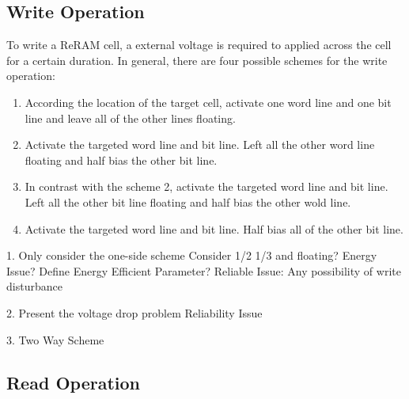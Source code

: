 \subsection{Write Operation}
To write a ReRAM cell, a external voltage is required to applied across the cell for a certain duration. In general, there are four possible schemes for the write operation:
\begin{enumerate}
  \item According the location of the target cell, activate one word line and one bit line and leave all of the other lines floating.
  \item Activate the targeted word line and bit line. Left all the other word line floating and half bias the other bit line.
  \item In contrast with the scheme 2, activate the targeted word line and bit line. Left all the other bit line floating and half bias the other wold line.
  \item Activate the targeted word line and bit line. Half bias all of the other bit line.
\end{enumerate}


1. Only consider the one-side scheme
Consider 1/2 1/3 and floating?
Energy Issue? Define Energy Efficient Parameter?
Reliable Issue: Any possibility of write disturbance




2. Present the voltage drop problem
Reliability Issue

3. Two Way Scheme

\subsection{Read Operation} 